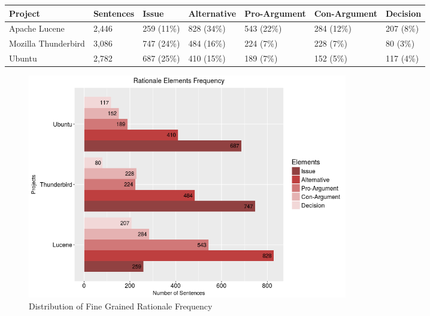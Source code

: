 \documentclass[a4paper,12pt,twoside]{report}
\begin{document}
\begin{table} %
    \centering
    \begin{adjustbox}{max width=\columnwidth}
    \def\arraystretch{1} %
    \begin{tabular}{p{4cm} p{2cm} p{2cm} p{3cm} p{2cm} p{2cm} p{2cm}}
        \toprule
        \textbf{Project} & \textbf{Sentences} & \textbf{Issue} & \textbf{Alternative} & \textbf{Pro-Argument}  & \textbf{Con-Argument}  & \textbf{Decision} \\
        \midrule
			Apache Lucene & 2,446 & 259 (11\%) & 828 (34\%)  & 543 (22\%) & 284 (12\%) & 207 (8\%)\\
			Mozilla Thunderbird & 3,086 & 747 (24\%) & 484 (16\%) & 224 (7\%) & 228 (7\%) & 80 (3\%)\\ 
			Ubuntu & 2,782 & 687 (25\%) & 410 (15\%) & 189 (7\%) & 152 (5\%) & 117 (4\%)\\
        \midrule
    \end{tabular}
    \end{adjustbox}
    \label{tab:distroMultiRationale}
\end{table}

\begin{figure}[h] %
    \centering
    \includegraphics[width=14cm]{multi-distro-rationale}
    \caption{Distribution of Fine Grained Rationale Frequency}
    \label{fig:distroMultiRationale}
\end{figure}

\end{document}

